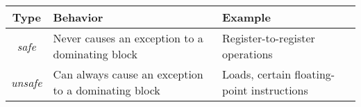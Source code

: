 \begin{table}
\label{tab:save_unsafe}
    \begin{tabularx}{\linewidth}{|>{\centering\arraybackslash}c|X|X|}
    \hline
    \rowcolor{gray!50}
    \textbf{Type} & \textbf{Behavior} & \textbf{Example} \\ \hline
    \textit{safe} & Never causes an exception to a dominating block & Register-to-register operations \\ \hline
    \textit{unsafe} & Can always cause an exception to a dominating block & Loads, certain floating-point instructions \\
    \hline
    \end{tabularx}
\end{table}
